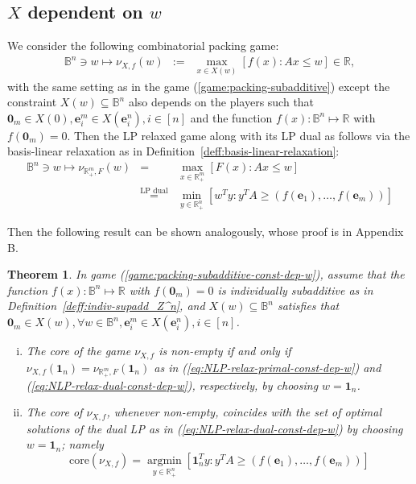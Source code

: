 \documentclass[11pt]{article}\usepackage[]{graphicx}\usepackage[]{xcolor}
\newtheorem{thm}{Theorem}
\DeclareMathOperator*{\argmin}{argmin}
\begin{document}
\subsection{$X$ dependent on $w$}\label{subsec:gene-constraint-pack-game}
We consider the following combinatorial packing game:
\begin{eqnarray}\label{game:packing-subadditive-const-dep-w}
 \mathbb{B}^n\ni w\mapsto \nu_{X, f}(w)&:=&\max\limits_{x\in X(w)}\left[f(x): Ax\le w\right]\in \mathbb{R},
\end{eqnarray}
with the same setting as in the game (\ref{game:packing-subadditive}) except the constraint $X(w)\subseteq \mathbb{B}^n$ also depends on the players such that $\mathbf{0}_m\in X(0), \mathbf{e}^m_i\in X(\mathbf{e}^n_i), i\in [n]$ and the function $f(x): \mathbb{B}^n\mapsto\mathbb{R}$ with $f(\mathbf{0}_m)=0$.
Then the LP relaxed game along with its LP dual as follows via the basis-linear relaxation as in Definition~\ref{deff:basis-linear-relaxation}:
\begin{eqnarray}
\label{eq:NLP-relax-primal-const-dep-w}\mathbb{B}^n\ni w\mapsto \nu_{\mathbb{R}^m_{+}, F}\left(w\right)&=&\max\limits_{x\in \mathbb{R}^m_{+}} \left[F(x): Ax\le w\right]\\
\label{eq:NLP-relax-dual-const-dep-w}&\overset{\text{LP dual}}{=}&\min_{y\in\mathbb{R}^n_{+}}\left[w^Ty: y^TA\ge (f(\mathbf{e}_1),\dots, f(\mathbf{e}_m))\right]
\end{eqnarray}

Then the following result can be shown analogously, whose proof is in Appendix B. 
\begin{thm}\label{thm:nonlinear-packing-const-dep-w}
In game (\ref{game:packing-subadditive-const-dep-w}), assume that the function $f(x): \mathbb{B}^n\mapsto\mathbb{R}$ with $f(\mathbf{0}_m)=0$  is individually subadditive as in Definition~\ref{deff:indiv-supadd_Z^n}, and $X(w)\subseteq \mathbb{B}^n$ satisfies that $\mathbf{0}_m\in X(w), \forall w\in \mathbb{B}^n,  \mathbf{e}^m_i\in X(\mathbf{e}^n_i), i\in [n]$.  
\begin{enumerate}[(i)]
\item The core of the game $\nu_{X, f}$ is non-empty if and only if $\nu_{X, f}\left(\mathbf{1}_n\right)=\nu_{\mathbb{R}^m_{+}, F}\left(\mathbf{1}_n\right)$ as in (\ref{eq:NLP-relax-primal-const-dep-w}) and (\ref{eq:NLP-relax-dual-const-dep-w}), respectively, by choosing $w=\mathbf{1}_n$.
\item The core of $\nu_{X, f}$, whenever non-empty, coincides with the set of optimal solutions of the dual LP as in (\ref{eq:NLP-relax-dual-const-dep-w}) by choosing $w=\mathbf{1}_n$; namely
 \[
 \text{core} \left(\nu_{X, f}\right)=\argmin\limits_{y\in \mathbb{R}^n_{+}} \left[\mathbf{1}_n^Ty: y^TA\ge (f(\mathbf{e}_1),\dots, f(\mathbf{e}_m))\right]
 \]
\end{enumerate}
\end{thm}
\end{document}
